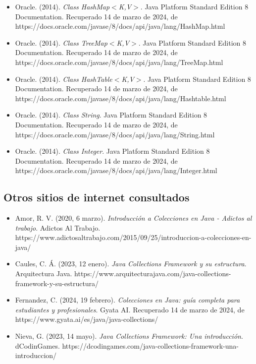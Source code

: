 \documentclass[a4paper,12pt]{article}
\begin{document}
\begin{itemize}
    \item Oracle. (2014). \textit{Class HashMap$<$K,V$>$}. Java Platform Standard Edition 8 Documentation. Recuperado 14 de marzo de 2024, de\\https://docs.oracle.com/javase/8/docs/api/java/lang/HashMap.html
    \item Oracle. (2014). \textit{Class TreeMap$<$K,V$>$}. Java Platform Standard Edition 8 Documentation. Recuperado 14 de marzo de 2024, de\\https://docs.oracle.com/javase/8/docs/api/java/lang/TreeMap.html
    \item Oracle. (2014). \textit{Class HashTable$<$K,V$>$}. Java Platform Standard Edition 8 Documentation. Recuperado 14 de marzo de 2024, de\\https://docs.oracle.com/javase/8/docs/api/java/lang/Hashtable.html
    \item Oracle. (2014). \textit{Class String}. Java Platform Standard Edition 8 Documentation. Recuperado 14 de marzo de 2024, de\\https://docs.oracle.com/javase/8/docs/api/java/lang/String.html
    \item Oracle. (2014). \textit{Class Integer}. Java Platform Standard Edition 8 Documentation. Recuperado 14 de marzo de 2024, de\\https://docs.oracle.com/javase/8/docs/api/java/lang/Integer.html
\end{itemize}

\subsection{Otros sitios de internet consultados}

\begin{itemize}
    \item Amor, R. V. (2020, 6 marzo). \textit{Introducción a Colecciones en Java - Adictos al trabajo}. Adictos Al Trabajo. https://www.adictosaltrabajo.com/2015/09/25/introduccion-a-colecciones-en-java/
    \item Caules, C. Á. (2023, 12 enero). \textit{Java Collections Framework y su estructura}. Arquitectura Java. https://www.arquitecturajava.com/java-collections-framework-y-su-estructura/
    \item Fernandez, C. (2024, 19 febrero). \textit{Colecciones en Java: guía completa para estudiantes y profesionales}. Gyata AI. Recuperado 14 de marzo de 2024, de\\https://www.gyata.ai/es/java/java-collections/
    \item Nieva, G. (2023, 14 mayo). \textit{Java Collections Framework: Una introducción}. dCodinGames. https://dcodingames.com/java-collections-framework-una-introduccion/
\end{itemize}
\end{document}
